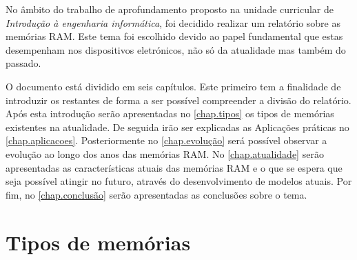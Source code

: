 \documentclass{report}
\begin{document}
\par No âmbito do trabalho de aprofundamento proposto na unidade curricular de \textit{Introdução à engenharia informática}, foi decidido realizar um relatório sobre as memórias \ac{RAM}. Este tema foi escolhido devido ao papel fundamental que estas desempenham nos dispositivos eletrónicos, não só da atualidade mas também do passado.
\par O documento está dividido em seis capítulos. Este primeiro tem a finalidade de introduzir os restantes de forma a ser possível compreender a divisão do relatório. Após esta introdução serão apresentadas no \autoref{chap.tipos} os tipos de memórias existentes na atualidade. De seguida irão ser explicadas as Aplicações práticas no \autoref{chap.aplicacoes}. Posteriormente no \autoref{chap.evolução} será possível observar a evolução ao longo dos anos das memórias \ac{RAM}. No \autoref{chap.atualidade} serão apresentadas as características atuais das memórias \ac{RAM} e o que se espera que seja possível atingir no futuro, através do desenvolvimento de modelos atuais. Por fim, no \autoref{chap.conclusão} serão apresentadas as conclusões sobre o tema.


\chapter{Tipos de memórias}
\label{chap.tipos}
\end{document}

